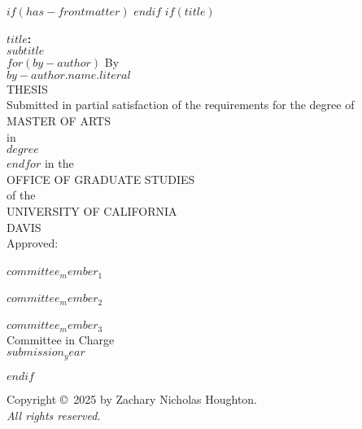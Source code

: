 $if(has-frontmatter)$
\frontmatter
$endif$
$if(title)$
\cleardoublepage
\thispagestyle{plain}
\begin{center}
   \null\vfill
   \textbf{%
      $title$:\\
	  $subtitle$
   }%
   \\
$for(by-author)$
   \bigskip
   By \\
   \bigskip
   {$by-author.name.literal$}
\\   
   THESIS \\
   \bigskip
   Submitted in partial satisfaction of the requirements for the
   degree of \\
   \bigskip
   MASTER OF ARTS \\
   \bigskip
   in \\
   \bigskip
   {$degree$} \\ 
   $endfor$
   \bigskip
   in the \\
   \bigskip
   OFFICE OF GRADUATE STUDIES \\
   \bigskip        
   of the \\
   \bigskip
   UNIVERSITY OF CALIFORNIA \\
   \bigskip
   DAVIS \\
   \bigskip
   Approved: \\
   \bigskip
   \bigskip
   \makebox[3in]{\hrulefill} \\
   $committee_member_1$ \\
   \bigskip
   \bigskip
   \makebox[3in]{\hrulefill} \\
   $committee_member_2$ \\
   \bigskip
   \bigskip
   \makebox[3in]{\hrulefill} \\
   $committee_member_3$ \\
   \bigskip
   Committee in Charge \\
   \bigskip
   $submission_year$ \\
   \vfill
\end{center}
$endif$


\newpage
{}
\setcounter{savedpage}{\value{page}}

\thispagestyle{empty}
\begin{titlepage}
\begin{center}
  Copyright \copyright\ 2025 by Zachary Nicholas Houghton. \\
  \textit{All rights reserved.}
\end{center}
\end{titlepage}

\setcounter{page}{\value{savedpage}} %
\clearpage

